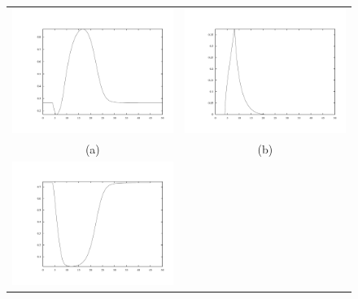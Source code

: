 \documentclass{article}
\begin{document}
\begin{figure}
  \centering
  \begin{tabular}{cc}
    \includegraphics[scale = 0.23, angle = 0]{carbonTime.pdf} &
    \includegraphics[scale = 0.23, angle = 0]{antiTime.pdf}  \\
    (a) & (b) \\
    \includegraphics[scale = 0.23, angle = 0]{bactTime.pdf} &

\end{tabular}
\end{figure}
\end{document}

